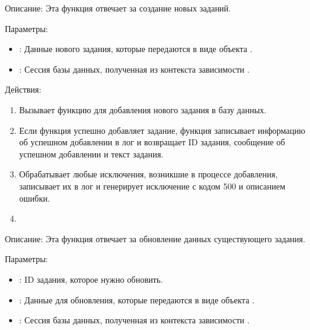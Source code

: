 \documentclass[letterpaper,10pt,russian]{sphinxmanual}
\begin{document}
\sphinxAtStartPar
Описание: Эта функция отвечает за создание новых заданий.

\sphinxAtStartPar
Параметры:
\begin{itemize}
\item {} 
\sphinxAtStartPar
{}: Данные нового задания, которые передаются в виде объекта .

\item {} 
\sphinxAtStartPar
{}: Сессия базы данных, полученная из контекста зависимости .

\end{itemize}

\sphinxAtStartPar
Действия:
\begin{enumerate}
%
\item {} 
\sphinxAtStartPar
Вызывает функцию  для добавления нового задания в базу данных.

\item {} 
\sphinxAtStartPar
Если функция  успешно добавляет задание, функция записывает информацию об успешном добавлении в лог и возвращает ID задания, сообщение об успешном добавлении и текст задания.

\item {} 
\sphinxAtStartPar
Обрабатывает любые исключения, возникшие в процессе добавления, записывает их в лог и генерирует исключение  с кодом 500 и описанием ошибки.

\item {} 
\sphinxAtStartPar
{}

\end{enumerate}

\sphinxAtStartPar
Описание: Эта функция отвечает за обновление данных существующего задания.

\sphinxAtStartPar
Параметры:
\begin{itemize}
\item {} 
\sphinxAtStartPar
{}: ID задания, которое нужно обновить.

\item {} 
\sphinxAtStartPar
{}: Данные для обновления, которые передаются в виде объекта .

\item {} 
\sphinxAtStartPar
{}: Сессия базы данных, полученная из контекста зависимости .

\end{itemize}
\end{document}
